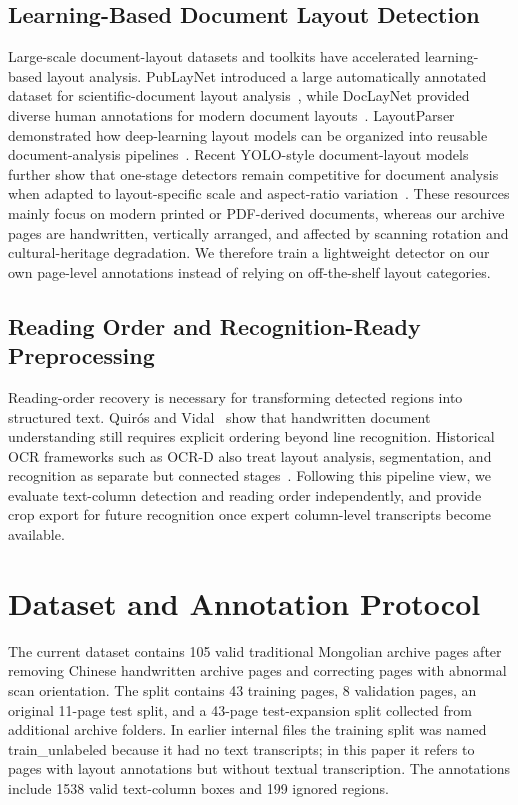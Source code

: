 \documentclass[pdflatex,sn-mathphys-num]{sn-jnl}
\begin{document}
\subsection{Learning-Based Document Layout Detection}
Large-scale document-layout datasets and toolkits have accelerated learning-based layout analysis. PubLayNet introduced a large automatically annotated dataset for scientific-document layout analysis~\cite{zhong2019publaynet}, while DocLayNet provided diverse human annotations for modern document layouts~\cite{pfitzmann2022doclaynet}. LayoutParser demonstrated how deep-learning layout models can be organized into reusable document-analysis pipelines~\cite{shen2021layoutparser}. Recent YOLO-style document-layout models further show that one-stage detectors remain competitive for document analysis when adapted to layout-specific scale and aspect-ratio variation~\cite{deng2023yolo, zhao2024doclayout}. These resources mainly focus on modern printed or PDF-derived documents, whereas our archive pages are handwritten, vertically arranged, and affected by scanning rotation and cultural-heritage degradation. We therefore train a lightweight detector on our own page-level annotations instead of relying on off-the-shelf layout categories.

\subsection{Reading Order and Recognition-Ready Preprocessing}
Reading-order recovery is necessary for transforming detected regions into structured text. Quir\'os and Vidal~\cite{quiros2022reading} show that handwritten document understanding still requires explicit ordering beyond line recognition. Historical OCR frameworks such as OCR-D also treat layout analysis, segmentation, and recognition as separate but connected stages~\cite{neudecker2019ocrd}. Following this pipeline view, we evaluate text-column detection and reading order independently, and provide crop export for future recognition once expert column-level transcripts become available.

\section{Dataset and Annotation Protocol}
The current dataset contains 105 valid traditional Mongolian archive pages after removing Chinese handwritten archive pages and correcting pages with abnormal scan orientation. The split contains 43 training pages, 8 validation pages, an original 11-page test split, and a 43-page test-expansion split collected from additional archive folders. In earlier internal files the training split was named train\_unlabeled because it had no text transcripts; in this paper it refers to pages with layout annotations but without textual transcription. The annotations include 1538 valid text-column boxes and 199 ignored regions.
\end{document}
